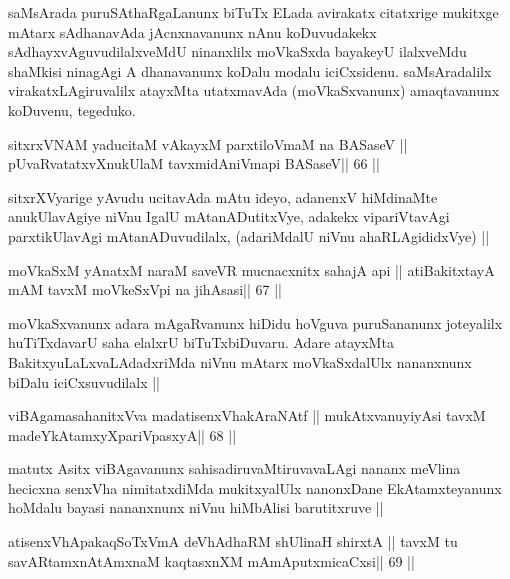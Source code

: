 \begin{artha}
saMsArada puruSAthaRgaLanunx biTuTx ELada avirakatx citatxrige
mukitxge mAtarx sAdhanavAda jAcnxnavanunx nAnu koDuvudakekx
sAdhayxvAguvudilalxveMdU ninanxlilx moVkaSxda bayakeyU ilalxveMdu
shaMkisi ninagAgi A dhanavanunx koDalu modalu
iciCxsidenu. saMsAradalilx virakatxLAgiruvalilx atayxMta utatxmavAda
(moVkaSxvanunx) amaqtavanunx koDuvenu, tegeduko.
\end{artha}

\begin{shl}
sitxrxVNAM yaducitaM vAkayxM parxtiloVmaM na BASaseV ||
pUvaRvatatxvXnukUlaM tavxmidAniVmapi BASaseV\hfill || 66 ||
\end{shl}

\begin{artha}
sitxrXVyarige yAvudu ucitavAda mAtu ideyo, adanenxV hiMdinaMte
anukUlavAgiye niVnu IgalU mAtanADutitxVye, adakekx vipariVtavAgi
parxtikUlavAgi mAtanADuvudilalx, (adariMdalU niVnu ahaRLAgididxVye) ||
\end{artha}

\begin{shl}
moVkaSxM yAnatxM naraM saveVR mucnacxnitx sahajA api ||
atiBakitxtayA mAM tavxM moVkeSxV\s pi na jihAsasi\hfill || 67 ||
\end{shl}

\begin{artha}
moVkaSxvanunx adara mAgaRvanunx hiDidu hoVguva puruSananunx joteyalilx
huTiTxdavarU saha elalxrU biTuTxbiDuvaru. Adare atayxMta
BakitxyuLaLxvaLAdadxriMda niVnu mAtarx moVkaSxdalUlx nananxnunx biDalu
iciCxsuvudilalx ||
\end{artha}

\begin{shl}
viBAgamasahanitxVva madatisenxVhakAraNAtf ||
mukAtxvanuyiyAsi tavxM madeYkAtamxyXpariVpasxyA\hfill || 68 ||
\end{shl}

\begin{artha}
matutx Asitx viBAgavanunx sahisadiruvaMtiruvavaLAgi nananx meVlina
hecicxna senxVha nimitatxdiMda mukitxyalUlx nanonxDane EkAtamxteyanunx
hoMdalu bayasi nananxnunx niVnu hiMbAlisi barutitxruve ||
\end{artha}

\begin{shl}
atisenxVhA\s pakaqSoTxVmA deVhAdhaRM shUlinaH shirxtA ||
tavxM tu savARtamxnA\s\s tAmxnaM kaqtasxnXM mAmAputxmicaCxsi\hfill || 69 ||
\end{shl}

